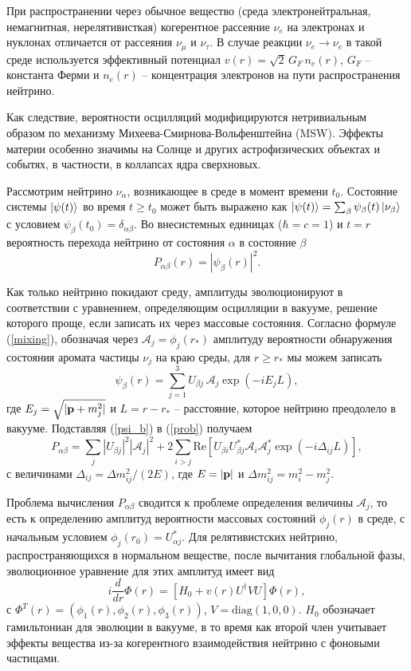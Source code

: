 \documentclass[12pt]{article}
\numberwithin{equation}{section}
\begin{document}
При распространении через обычное вещество (среда электронейтральная,
немагнитная, нерелятивисткая) когерентное рассеяние $\nu_e$ на электронах и нуклонах отличается от рассеяния $\nu_{\mu}$ и $\nu_{\tau}$. В случае реакции $\nu_e \to \nu_e$ в такой среде используется эффективный потенциал $v(r)=\sqrt{2}\,G_F\,n_e(r)$, $G_F$ -- константа Ферми и $n_e(r)$ -- концентрация электронов на пути распространения нейтрино.

Как следствие, вероятности осцилляций модифицируются нетривиальным образом по механизму Михеева-Смирнова-Вольфенштейна (MSW). Эффекты материи особенно значимы на Солнце и других астрофизических объектах и событях, в частности, в коллапсах ядра сверхновых. 

Рассмотрим нейтрино $\nu_\alpha$, возникающее в среде в момент времени $t_0$. Состояние системы $\ket{\psi(t)}$ во время $t\geqslant t_0$ может быть выражено как $\ket{\psi(t)}=\sum_\beta \psi_\beta(t)\ket{\nu_\beta}$ с условием $\psi_\beta(t_0)=\delta_{\alpha\beta}$. Во внесистемных единицах ($\hbar=c=1$) и $t=r$ вероятность перехода нейтрино от состояния $\alpha$ в состояние $\beta$
\begin{equation}
\label{prob}
P_{\alpha\beta}(r)=|\psi_\beta(r)|^2.
\end{equation}

Как только нейтрино покидают среду, амплитуды эволюционируют в соответствии с уравнением, определяющим осцилляции в вакууме, решение которого проще, если записать их через массовые состояния. Согласно формуле (\ref{mixing}), обозначая через $\mathcal{A}_j=\phi_j(r_*)$ амплитуду вероятности обнаружения состояния аромата частицы $\nu_j$ на краю среды, для $r \geqslant r_*$ мы можем записать
\begin{equation}
\label{psi_b}
\psi_\beta(r)=\sum\limits_{j=1}^3 U_{\beta j}\, \mathcal{A}_j \exp(-iE_jL),
\end{equation}
где $E_j=\sqrt{|{\bf p}+m^2_j|}$ и $L=r-r_*$ -- расстояние, которое нейтрино преодолело в вакууме. Подставляя (\ref{psi_b}) в (\ref{prob}) получаем
\begin{equation}
P_{\alpha\beta}=\sum\limits_j |U_{\beta j}|^2 |\mathcal{A}_j|^2+2\sum\limits_{i>j}\text{Re}[U_{\beta i}U^*_{\beta j}\mathcal{A}_i\mathcal{A}^*_j\exp(-i\Delta_{ij}L)],
\end{equation}
с величинами $\Delta_{ij}=\Delta m^2_{ij}/(2E)$, где $E=|\bf p|$ и $\Delta m^2_{ij} \!= m^2_{i} - m^2_{j}$.

Проблема вычисления $P_{\alpha\beta}$ сводится к проблеме определения величины $\mathcal{A}_j$, то есть к определению амплитуд вероятности массовых состояний $\phi_j(r)$ в среде, с начальным условием $\phi_j(r_0)=U^*_{\alpha j}$. Для релятивистских нейтрино, распространяющихся в нормальном веществе, после вычитания глобальной фазы, эволюционное уравнение для этих амплитуд имеет вид
\begin{equation}
\label{Shr}
i\frac{d}{dr} \Phi(r)=[H_0+v(r)U^\dagger V U] \Phi(r),
\end{equation}
с $\Phi^T(r)=(\phi_1(r),\phi_2(r),\phi_3(r))$, $V=\text{diag}(1,0,0)$.  $H_0$ обозначает гамильтониан для эволюции в вакууме, в то время как второй член учитывает эффекты вещества из-за когерентного взаимодействия нейтрино с фоновыми частицами.
\end{document}
